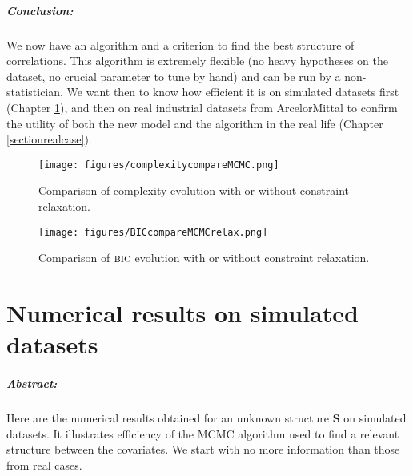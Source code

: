 \documentclass[12pt,a4paper]{report}
\begin{document}
		
\paragraph{Conclusion:}	We now have an algorithm and a criterion to find the best structure of correlations. This algorithm is extremely flexible (no heavy hypotheses on the dataset, no crucial parameter to tune by hand) and can be run by a non-statistician. We want then to know how efficient it is on simulated datasets first (Chapter \ref{sectionsimul}), and then on real industrial datasets from ArcelorMittal to confirm the utility of both the new model and the algorithm in the real life (Chapter \ref{sectionrealcase}).
		
\begin{center}
	\begin{figure}[h!]
	\centering
\texttt{[image: figures/complexitycompareMCMC.png]} 		
\caption{Comparison of complexity evolution with or without constraint relaxation.}\label{comparecomplrelax}
	\end{figure}
	\end{center}
			
\begin{center}
	\begin{figure}[h!]
	\centering
\texttt{[image: figures/BICcompareMCMCrelax.png]} 		
\caption{Comparison of $\mbox{{\sc bic}}$ evolution with or without constraint relaxation.}\label{compareBICrelax}
	\end{figure}
	\end{center}
			
		
	\chapter{Numerical results on simulated datasets} \label{sectionsimul}
\paragraph{Abstract:} Here are the numerical results obtained for an unknown structure $\boldsymbol{S}$ on simulated datasets. It illustrates efficiency of the MCMC algorithm used to find a relevant structure between the covariates. We start with no more information than those from real cases.
		 
\end{document}
